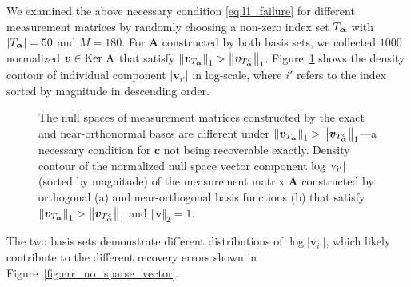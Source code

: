 We examined the above necessary condition \eqref{eq:l1_failure} for different measurement matrices by randomly choosing a non-zero index set 
$T_{\bm\alpha}$ with $\left\vert T_{\bm\alpha}\right\vert = 50$ and $M = 180$.
For $\bm A$ constructed by both basis sets, we collected $1000$ normalized  $\bm v\in\rm{Ker}~\bm A $ that satisfy $\left \Vert \bm v_{T_{\bm\alpha}}\right \Vert_1 > \left \Vert \bm v_{T_{\bm\alpha}^c}\right\Vert_1$.
Figure~\ref{fig:contour_null_vector} shows the density contour of individual component $\left\vert \bm v_{i'}\right\vert$ in log-scale, where $i'$ refers to the index sorted by magnitude in descending order.
\begin{figure}[tbp]
  \center
  \caption{{The null spaces of measurement matrices constructed by the exact and near-orthonormal bases are different under $\left \Vert \bm v_{T_{\bm\alpha}}\right \Vert_1 > \left \Vert \bm v_{T_{\bm\alpha}^c}\right\Vert_1$---a necessary
    condition for $\bm c$ not being recoverable exactly.}
  Density contour of the normalized null space vector component $\log\vert \rm {v}_{i'}\vert $ (sorted by magnitude) of the measurement matrix $\bm A$ constructed by orthogonal (a) and near-orthogonal basis functions (b) that satisfy $\left \Vert \bm v_{T_{\bm\alpha}}\right \Vert_1 > \left \Vert \bm v_{T_{\bm\alpha}^c}\right\Vert_1$ and $\Vert \bm v\Vert_2 = 1$.} \label{fig:contour_null_vector}
\end{figure}
The two basis sets demonstrate different distributions of $\log\left\vert \bm v_{i'}\right\vert$, which likely contribute 
to the different recovery errors shown in Figure~\ref{fig:err_no_sparse_vector}. 


